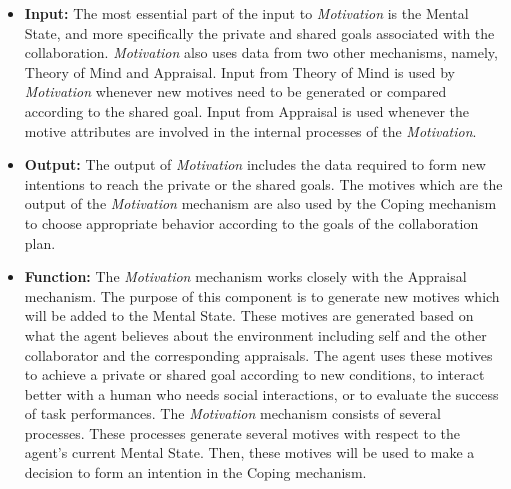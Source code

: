 \documentclass[12pt]{report}
\begin{document}
\begin{itemize}
  \item \textbf{Input:} The most essential part of the input to
  \textit{Motivation} is the Mental State, and more specifically the private
  and shared goals associated with the collaboration. \textit{Motivation} also
  uses data from two other mechanisms, namely, Theory of Mind and Appraisal.
  Input from Theory of Mind is used by \textit{Motivation} whenever new motives
  need to be generated or compared according to the shared goal. Input from
  Appraisal is used whenever the motive attributes are involved in the internal
  processes of the \textit{Motivation}.
  
  \item \textbf{Output:} The output of \textit{Motivation} includes the data
  required to form new intentions to reach the private or the shared goals.
  The motives which are the output of the \textit{Motivation} mechanism
  are also used by the Coping mechanism to choose appropriate behavior according
  to the goals of the collaboration plan.
  
  \item \textbf{Function:} The \textit{Motivation} mechanism works closely  
  with the Appraisal mechanism. The purpose of this component is to generate new
  motives which will be added to the Mental State. These motives are generated
  based on what the agent believes about the environment including self and the
  other collaborator and the corresponding appraisals. The agent uses these
  motives to achieve a private or shared goal according to new conditions, to
  interact better with a human who needs social interactions, or to evaluate the
  success of task performances. The \textit{Motivation} mechanism consists of
  several processes. These processes generate several motives with respect to
  the agent's current Mental State. Then, these motives will be used to make a
  decision to form an intention in the Coping mechanism.
\end{itemize}
\end{document}
